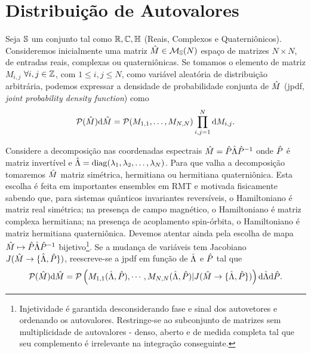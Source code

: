 \section{Distribuição de Autovalores}

Seja $\mathbb{S}$ um conjunto tal como $\mathbb{R}, \mathbb{C}, \mathbb{H} $ (Reais, Complexos e Quaterniônicos). Consideremos inicialmente uma matriz $\hat M \in \mathcal{M}_{\mathbb{S}}(N)$ espaço de matrizes $N \times N$, de entradas reais, complexas ou quaterniônicas. Se tomamos o elemento de matriz $M_{i,j}$ $\forall i, j \in \mathbb{Z}$, com $1 \leq i, j \leq N$, como variável aleatória de distribuição arbitrária, podemos expressar a densidade de probabilidade conjunta de $\hat M$ (jpdf, \textit{joint probability density function}) como $$\mathcal{P}(\hat{M}) \dd \hat M = \mathcal{P}(M_{1,1}, \dots, M_{N,N}) \prod_{i,j=1}^{N} \dd M_{i,j}.$$

Considere a decomposição nas coordenadas espectrais $\hat M = \hat P \hat\Lambda \hat P^{-1}$ onde $\hat P$ é matriz invertível e $\hat\Lambda = \operatorname{diag}(\lambda_1, \lambda_2, \dots, \lambda_N)$. Para que valha a decomposição tomaremos $\hat M$ matriz simétrica, hermitiana ou hermitiana quaterniônica. Esta escolha é feita em importantes ensembles em RMT e motivada fisicamente sabendo que, para sistemas quânticos invariantes reversíveis, o Hamiltoniano é matriz real simétrica; na presença de campo magnético, o Hamiltoniano é matriz complexa hermitiana; na presença de acoplamento spin-órbita, o Hamiltoniano é matriz hermitiana quaterniônica. \cite[Capítulo~2]{RMT-firstcourse-Potters} Devemos atentar ainda pela escolha de mapa $\hat M \mapsto \hat P \hat\Lambda \hat P^{-1}$ bijetivo\footnote{Injetividade é garantida desconsiderando fase e sinal dos autovetores e ordenando os autovalores. Restringe-se ao subconjunto de matrizes sem multiplicidade de autovalores - denso, aberto e de medida completa tal que seu complemento é irrelevante na integração conseguinte.}. Se a mudança de variáveis tem Jacobiano $J(\hat M \rightarrow \{ \hat\Lambda, \hat P \} )$, reescreve-se a jpdf em função de $\hat\Lambda$ e $\hat P$ tal que
\begin{equation}
	 \mathcal{P}(\hat{M}) \dd \hat M = \mathcal{P} \left( M_{1,1}(\hat\Lambda, \hat P), \cdots, M_{N,N}(\hat\Lambda, \hat P) | J(\hat M \rightarrow \{ \hat\Lambda, \hat P \} ) \right) \dd \hat\Lambda \dd \hat P.
\label{Equation: p(lambda, O)}
\end{equation}

